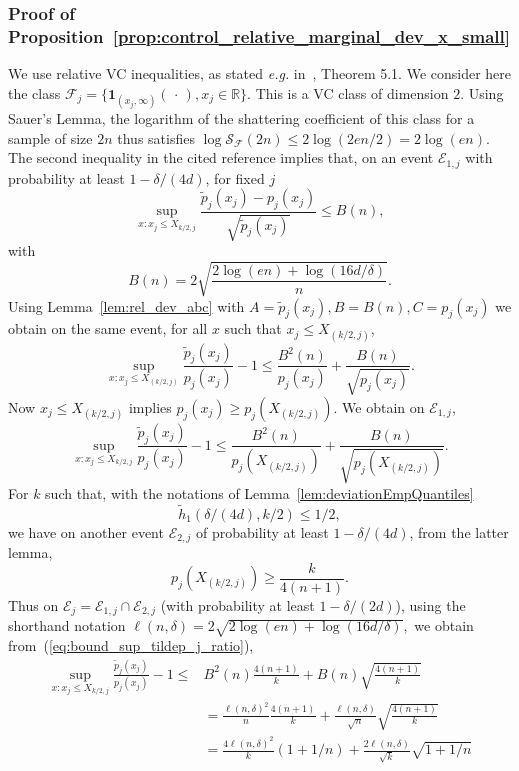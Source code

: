 \documentclass{article}
\numberwithin{equation}{section}
\newcommand{\rset}{\mathbb{R}}
\newcommand{\ind}{\mathbf{1}}
\newcommand{\un}{\ind}
\newcommand{\point}{\,\cdot\,}
\begin{document}
\subsubsection{Proof of Proposition~\ref{prop:control_relative_marginal_dev_x_small}}

 We use relative VC inequalities, as stated \emph{e.g.} in~\cite{boucheron2005theory}, Theorem 5.1. We consider here the class $\mathcal{F}_j = \{\un_{(x_j, \infty)}(\point),x_j \in\rset \}$. This is a VC class of dimension $2$. Using Sauer's Lemma, the logarithm of the shattering coefficient of this class for a sample   of size $2n$ thus satisfies
 $
\log \mathcal{S}_\mathcal{F}(2n) \le 2 \log(2en/2) = 2\log(en). 
$
The second  inequality in the cited reference implies that, on an event $\mathcal{E}_{1,j}$  with probability at least $1-\delta/(4d)$, for fixed $j$ 
  $$
 \sup_{x: x_j \le X_{ k/2,j}}
   \frac{\tilde p_j(x_j) -  p_j(x_j)}{\sqrt{\tilde p_j(x_j)}}  \le B(n), 
  $$
  with $$
  B(n) = 2 \sqrt{ \frac{2 \log(en) + \log(16d/\delta) }{n} }. 
      $$
      Using Lemma~\ref{lem:rel_dev_abc} with $A= \tilde p_j(x_j), B=B(n), C =  p_j(x_j)$ we obtain on the same event, for all $x$ such that $ x_j \le X_{ (k/2,j)}$, 
       $$
      \sup_{x: x_j \le X_{ (k/2,j)}}
      \frac{\tilde p_j(x_j)}{ p_j(x_j)} -1 \le \frac{B^2(n) }{p_j(x_j)} + \frac{B(n)}{\sqrt{p_j(x_j)}}.  
      $$
      Now $x_j\le X_{(k/2,j)}$ implies $p_j(x_j)\ge p_j(X_{(k/2,j)})$. We obtain on $\mathcal{E}_{1,j}$, 
      \begin{equation}
        \label{eq:bound_sup_tildep_j_ratio}
 \sup_{x: x_j \le X_{ k/2,j}}
   \frac{\tilde p_j(x_j)}{p_j(x_j)} -1 \le  \frac{B^2(n)}{p_j(X_{(k/2,j)})} + \frac{B(n)}{\sqrt{p_j(X_{(k/2,j)})}}. 
      \end{equation}
      For $k$ such that, with the notations of Lemma~\ref{lem:deviationEmpQuantiles} 
      $$
 \tilde h_1(\delta/(4d),k/2)  \le 1/2,  
      $$
      we have on another event $\mathcal{E}_{2,j}$ of probability at least $1- \delta/(4d)$, from the latter lemma,
      \begin{equation}
        \label{eq:lower_bound_p_j}
       p_j(X_{(k/2,j)})  \ge \frac{k }{4(n+1)}.  
      \end{equation}
       Thus on $\mathcal{E}_j = \mathcal{E}_{1,j}\cap \mathcal{E}_{2,j}$ (with probability at least $1 -  \delta/(2d)$), using the shorthand notation
      $
\ell(n,\delta) = 2 \sqrt{ 2 \log(en) + \log(16d/\delta) }, 
$
we obtain from~(\ref{eq:bound_sup_tildep_j_ratio}), 
      \begin{align}
        \sup_{x: x_j \le X_{ k/2,j}} \frac{\tilde p_j(x_j)}{p_j(x_j)} -1 \le 
        & B^2(n) \frac{4(n+1)}{k} + B(n) \sqrt{\frac{4(n+1)}{k} }\nonumber \\
        & =  \frac{\ell(n,\delta)^2}{n}  \frac{4(n+1)}{k} + \frac{\ell(n,\delta)}{\sqrt{n}} \sqrt{\frac{4(n+1)}{k} } \nonumber \\
        & = \frac{4 \ell(n,\delta)^2}{k} (1 +1/n) +
        \frac{2 \ell(n,\delta)}{\sqrt{k}} \sqrt{1 +1/n}
      \end{align}
\end{document}
